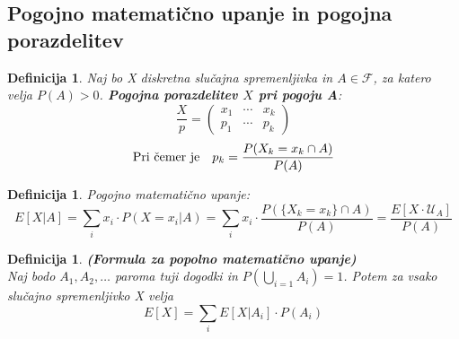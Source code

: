 \documentclass[11pt]{article}
\newtheorem{Definicija}[Izrek]{{\sc Definicija}}
\begin{document}
	\subsection{Pogojno matematično upanje in pogojna porazdelitev}
	\begin{Definicija}
		Naj bo X diskretna slučajna spremenljivka in $A\in \mathcal{F}$, za katero velja $P(A) >0$.\textbf{ Pogojna porazdelitev $X$ pri pogoju A}:
		\[
		\frac{X}{p} = \begin{pmatrix}
		x_1 & \cdots & x_k \\       p_1 & \cdots & p_k
		\end{pmatrix}
		\]
		$$\textnormal{Pri čemer je}\quad p_k= \frac{P(X_k =x_k \cap A)}{P(A)}$$
	\end{Definicija}
	
	\begin{Definicija}
		Pogojno matematično upanje:
		$$E[X|A] = \sum_{i}{x_i \cdot P(X=x_i|A)} = \sum_{i}{x_i \cdot \frac{P(\{X_k =x_k\} \cap A)}{P(A)}} = \frac{E[X\cdot \mathcal{U}_A]}{P(A)}$$
	\end{Definicija}
	\begin{Definicija}
		\textbf{(Formula za popolno matematično upanje)} \\
		Naj bodo $A_1,A_2, \dotsc$ paroma tuji dogodki in $P(\bigcup_{i=1}A_i) = 1$. Potem za vsako slučajno spremenljivko X velja $$E[X] = \sum_{i}E[X|A_i] \cdot P(A_i)$$ 
	\end{Definicija}
\end{document}
